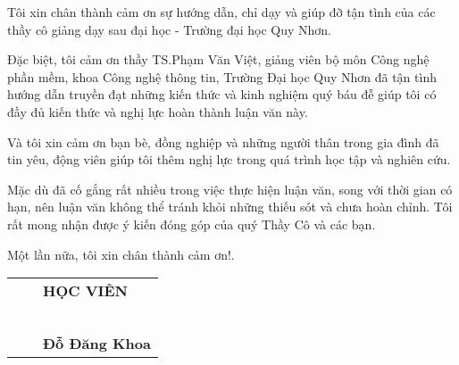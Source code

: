 
Tôi xin chân thành cảm ơn sự hướng dẫn, chỉ dạy và giúp đỡ tận tình của các thầy cô giảng dạy sau đại học - Trường đại học Quy Nhơn.

Đặc biệt, tôi cảm ơn thầy TS.Phạm Văn Việt, giảng viên bộ môn Công nghệ phần mềm, khoa Công nghệ thông tin, Trường Đại học Quy Nhơn đã tận tình hướng dẫn truyền đạt những kiến thức và kinh nghiệm quý báu đễ giúp tôi có đầy đủ kiến thức và nghị lực hoàn thành luận văn này.

Và tôi xin cảm ơn bạn bè, đồng nghiệp và những người thân trong gia đình đã tin yêu, động viên giúp tôi thêm nghị lực trong quá trình học tập và nghiên cứu.

Mặc dù đã cố gắng rất nhiều trong việc thực hiện luận văn, song với thời gian có hạn, nên luận văn không thể tránh khỏi những thiếu sót và chưa hoàn chỉnh. Tôi rất mong nhận được ý kiến đóng góp của quý Thầy Cô và các bạn.

Một lần nữa, tôi xin chân thành cảm ơn!.\\


\begin{tabu} to 1.0 \textwidth {  X[c] X[c]  X[c]   }

	 & &  \textbf{HỌC VIÊN} \\
	 \\ \\ \\ \\ \\ 
	 & &  \textbf{Đỗ Đăng Khoa}  \\
         
       \end{tabu}


